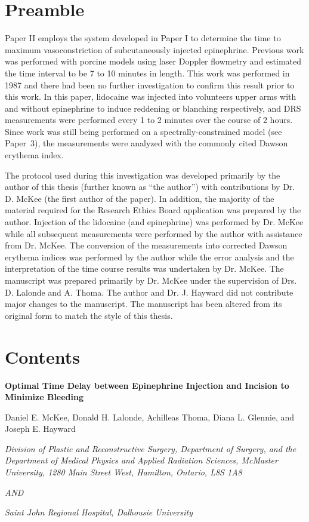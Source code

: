 \section*{Preamble}
Paper II employs the system developed in Paper I to determine the time to maximum vasoconstriction of subcutaneously injected epinephrine. Previous work was performed with porcine models using laser Doppler flowmetry and estimated the time interval to be 7 to 10 minutes in length.\cite{Larrabee1987} This work was performed in 1987 and there had been no further investigation to confirm this result prior to this work. In this paper, lidocaine was injected into volunteers upper arms with and without epinephrine to induce reddening or blanching respectively, and DRS measurements were performed every 1 to 2 minutes over the course of 2 hours. Since work was still being performed on a spectrally-constrained model (see Paper~3), the measurements were analyzed with the commonly cited Dawson erythema index.\cite{Dawson1980}

The protocol used during this investigation was developed primarily by the author of this thesis (further known as ``the author'') with contributions by Dr. D. McKee (the first author of the paper). In addition, the majority of the material required for the Research Ethics Board application was prepared by the author. Injection of the lidocaine (and epinephrine) was performed by Dr. McKee while all subsequent measurements were performed by the author with assistance from Dr. McKee. The conversion of the measurements into corrected Dawson erythema indices was performed by the author while the error analysis and the interpretation of the time course results was undertaken by Dr. McKee. The manuscript was prepared primarily by Dr. McKee under the supervision of Drs. D. Lalonde and A. Thoma. The author and Dr. J. Hayward did not contribute major changes to the manuscript. The manuscript has been altered from its original form to match the style of this thesis.

\section*{Contents}

\begin{center}

\textbf{Optimal Time Delay between Epinephrine Injection and Incision to Minimize Bleeding}

Daniel E. McKee, Donald H. Lalonde, Achilleas Thoma, Diana L. Glennie, and Joseph E. Hayward

\textit{Division of Plastic and Reconstructive Surgery, Department of Surgery, and the Department of Medical Physics and Applied Radiation Sciences, McMaster University, 1280 Main Street West, Hamilton, Ontario, L8S 1A8}

\textit{AND}

\textit{Saint John Regional Hospital, Dalhousie University}

\end{center}

